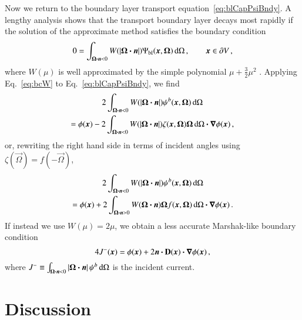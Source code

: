 \documentclass{anstrans}
\begin{document}
Now we return to the boundary layer transport equation~\eqref{eq:blCapPsiBndy}.
A lengthy analysis shows that the transport boundary layer decays most rapidly
if the solution of the approximate method satisfies the boundary condition
\begin{equation} \label{eq:bcW}
  0 = \int_{\bm{\Omega} \bm{\cdot} \bm{n} < 0} W(\left| \bm{\Omega} \bm{\cdot} \bm{n} \right|)
  \Psi_\mathrm{bl} (\bm{x}, \bm{\Omega}) \mathop{}\!\mathrm{d} \Omega\,,\qquad \bm{x} \in
  \partial V\,,
\end{equation}
where $W(\mu)$ is well approximated by the simple polynomial $\mu +
\tfrac{3}{2} \mu^2$ \cite{Mal1991}. 
Applying Eq.~\eqref{eq:bcW} to Eq.~\eqref{eq:blCapPsiBndy}, we find
\begin{multline*}
  2\int_{\bm{\Omega}\bm{\cdot} \bm{n} < 0}
  W(\left| \bm{\Omega} \bm{\cdot} \bm{n} \right|) \psi^b(\bm{x}, \bm{\Omega}) \mathop{}\!\mathrm{d}\Omega
 \\  = \phi(\bm{x})
 - 2\int_{\bm{\Omega}\bm{\cdot} \bm{n} < 0} W(\left| \bm{\Omega} \bm{\cdot} \bm{n} \right|)
  \zeta(\bm{x}, \bm{\Omega}) \bm{\Omega} \mathop{}\!\mathrm{d}\Omega
  \bm{\cdot} \bm{\nabla} \phi(\bm{x})\,,
\end{multline*}
or, rewriting the right hand side in terms of incident angles using
$\zeta(\vec{\Omega})= f(-\vec{\Omega})$,
\begin{multline}\label{eq:loBndy}
  2\int_{\bm{\Omega}\bm{\cdot} \bm{n} < 0}
  W(\left| \bm{\Omega} \bm{\cdot} \bm{n} \right|) \psi^b(\bm{x}, \bm{\Omega}) \mathop{}\!\mathrm{d}\Omega
 \\ = \phi(\bm{x})
  + 2\int_{\bm{\Omega}\bm{\cdot} \bm{n} > 0} W(\bm{\Omega} \bm{\cdot} \bm{n})
  \bm{\Omega} f(\bm{x}, \bm{\Omega}) \mathop{}\!\mathrm{d}\Omega
  \bm{\cdot} \bm{\nabla} \phi(\bm{x}) \,.
\end{multline}
If instead we use $W(\mu)=2\mu$, we obtain a less accurate Marshak-like
boundary condition
\begin{equation}\label{eq:marshakAd}
  4 J^-(\bm{x})
  = \phi(\bm{x})
  + 2 \bm{n} \bm{\cdot} \mathbf{D}(\bm{x}) \bm{\cdot} \bm{\nabla} \phi(\bm{x}) \,,
\end{equation}
where $J^- \equiv \int_{\bm{\Omega}\bm{\cdot} \bm{n} < 0} \left| \bm{\Omega} \bm{\cdot}
\bm{n} \right| \psi^b \mathop{}\!\mathrm{d}\Omega$ is the incident current.

\section{Discussion}
\end{document}
